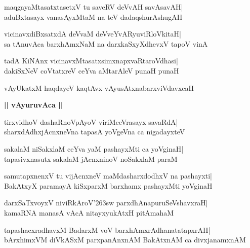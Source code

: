 \documentclass[twoside,12pt,openright]{book}
\def\S{\char'263}
\newcounter{shloka}[chapter]
\def\uvaca#1{\centerline{{\large\textbf{#1}}}}
\begin{document}
\begin{shloka}%
maqgayaMtasatxtasetxV tu saveRV deVvAH savAsavAH|\\
aduBxtasayx vanasAyxMtaM na teV dadaqshurAshugAH
\end{shloka}

\begin{shloka}%
vicinavxdiBxsatxdA deVvaM deVveYvARyuviRloVkitaH|\\
sa tAnuvAca barxhAmxNaM na darxkaSxyXdhevxV tapoV vinA
\end{shloka}

\begin{shloka}%
tadA KiNAnx vicinavxMtasatxsimxnapxvaRtaroVdhasi|\\
dakiSxNeV coVtatxreV ceYva aMtarAleV punaH punaH
\end{shloka}

\begin{shloka}%
vAyUkatxM haqdayeV kaqtAvx vAyusAtxnabarxviVdavxcaH
\end{shloka}

\uvaca{|| vAyuruvAca ||}
\begin{shloka}%
tirxvidhoV dashaRnoVpAyoV viriMceVrasayx savaRdA|\\
sharxdAdhxjAcnxneVna tapasA yoVgeVna ca nigadayxteV
\end{shloka}

\begin{shloka}%
sakalaM niSakxlaM ceYva yaM pashayxMti ca yoVginaH|\\
tapasivxnasutx sakalaM jAcnxninoV noSakxlaM paraM
\end{shloka}

\begin{shloka}%
samutapxnenxV tu vijAcnxneV maMdasharxdodhxV na pashayxti|\\
BakAtxyX paramayA kiSxparxM barxhamx pashayxMti yoVginaH
\end{shloka}

\begin{shloka}%
darxSaTxvoyxV niviRkAroV\S sw parxdhAnapuruSeVshavxraH|\\
kamaRNA manasA vAcA nitayxyukAtxH pitAmahaM
\end{shloka}

\begin{shloka}%
tapashacxradhavxM BadarxM voV barxhAmxrAdhanatatapxrAH|\\
bArxhimxVM diVkASxM parxpanAnxnAM BakAtxnAM ca divxjanamxnAM
\end{shloka}
\end{document}
